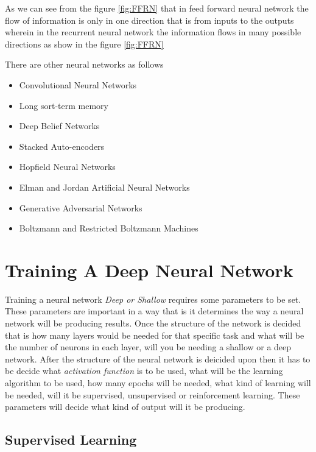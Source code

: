 \documentclass[12pt, a4paper]{report}
\begin{document}
As we can see from the figure \ref{fig:FFRN} that in feed forward neural network the flow of information is only in one direction that is from inputs to the outputs wherein in the recurrent neural network the information flows in many possible directions as show in the figure \ref{fig:FFRN} \\ \par
\clearpage
There are other neural networks as follows
\begin{itemize}
	\item Convolutional Neural Networks
	\item Long sort-term memory
	\item Deep Belief Networks
	\item Stacked Auto-encoders
	\item Hopfield Neural Networks 
	\item Elman and Jordan Artificial Neural Networks
	\item Generative Adversarial Networks
	\item Boltzmann and Restricted Boltzmann Machines
\end{itemize}
\section{Training A Deep Neural Network}\label{train}

Training a neural network \textit{Deep or Shallow} requires some parameters to be set. These parameters are important in a way that is it determines the way a neural network will be producing results. Once the structure of the network is decided that is how many layers would be needed for that specific task and what will be the number of neurons in each layer, will you be needing a shallow or a deep network. After the structure of the neural network is deicided upon then it has to be decide what \textit{activation function} is to be used, what will be the learning algorithm to be used, how many epochs will be needed, what kind of learning will be needed, will it be supervised, unsupervised or reinforcement learning. These parameters will decide what kind of output will it be producing.\\ \par

\subsection{Supervised Learning}\label{sec:supervisedLearning}
\end{document}
